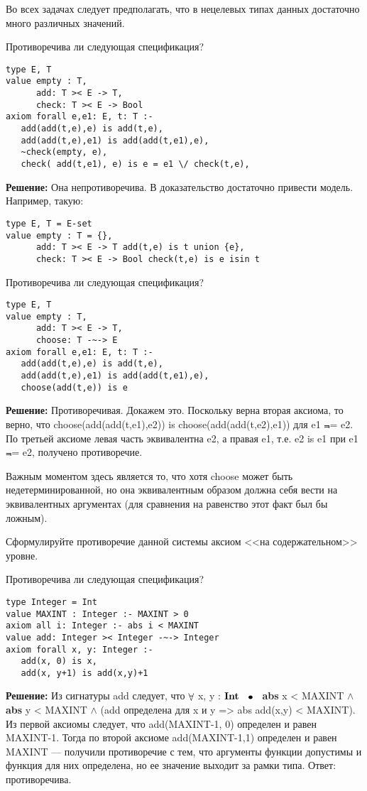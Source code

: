 Во всех задачах следует предполагать, что в нецелевых типах данных достаточно много различных значений.

\z Противоречива ли следующая спецификация?
\begin{lstlisting}
type E, T
value empty : T,
      add: T >< E -> T,
      check: T >< E -> Bool
axiom forall e,e1: E, t: T :-
   add(add(t,e),e) is add(t,e),
   add(add(t,e),e1) is add(add(t,e1),e),
   ~check(empty, e),
   check( add(t,e1), e) is e = e1 \/ check(t,e),
\end{lstlisting}

\textbf{Решение:}
Она непротиворечива. В доказательство достаточно привести модель. Например, такую:
\begin{lstlisting}
type E, T = E-set
value empty : T = {},
      add: T >< E -> T add(t,e) is t union {e},
      check: T >< E -> Bool check(t,e) is e isin t
\end{lstlisting}

\z Противоречива ли следующая спецификация?
\begin{lstlisting}
type E, T
value empty : T,
      add: T >< E -> T,
      choose: T -~-> E
axiom forall e,e1: E, t: T :-
   add(add(t,e),e) is add(t,e),
   add(add(t,e),e1) is add(add(t,e1),e),
   choose(add(t,e)) is e
\end{lstlisting}

\textbf{Решение:}
Противоречивая. Докажем это. Поскольку верна вторая аксиома, то верно, что choose(add(add(t,e1),e2)) is choose(add(add(t,e2),e1)) для e1 $\Not$= e2. По третьей аксиоме левая часть эквивалентна e2, а правая e1, т.е. e2 is e1 при e1 $\Not$= e2, получено противоречие.

Важным моментом здесь является то, что хотя choose может быть недетерминированной, но она эквивалентным образом должна себя вести на эквивалентных аргументах (для сравнения на равенство этот факт был бы ложным).

Сформулируйте противоречие данной системы аксиом <<на содержательном>> уровне.

\z Противоречива ли следующая спецификация?
\begin{lstlisting}
type Integer = Int
value MAXINT : Integer :- MAXINT > 0
axiom all i: Integer :- abs i < MAXINT
value add: Integer >< Integer -~-> Integer
axiom forall x, y: Integer :-
   add(x, 0) is x,
   add(x, y+1) is add(x,y)+1
\end{lstlisting}

\textbf{Решение:}
Из сигнатуры add следует, что $\mathop{\forall}$ x, y : $\textbf{Int}$ ~$\mathop{\bullet}$~ \textbf{abs} x < MAXINT $\wedge$ \textbf{abs} y < MAXINT $\wedge$ (add определена для x и y => abs add(x,y) < MAXINT). Из первой аксиомы следует, что add(MAXINT-1, 0) определен и равен MAXINT-1. Тогда по второй аксиоме add(MAXINT-1,1) определен и равен MAXINT --- получили противоречие с тем, что аргументы функции допустимы и функция для них определена, но ее значение выходит за рамки типа. Ответ: противоречива.

